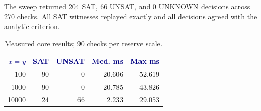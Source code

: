 The sweep returned 204 SAT, 66 UNSAT, and 0 UNKNOWN decisions across 270 checks. All SAT witnesses replayed exactly and all decisions agreed with the analytic criterion.
\begin{table}[t]\centering\caption{Measured core results; 90 checks per reserve scale.}\begin{tabular}{rrrrr}\toprule
\textcolor{Navy}{$x=y$} & \textcolor{Navy}{SAT} & \textcolor{Navy}{UNSAT} & \textcolor{Navy}{Med. ms} & \textcolor{Navy}{Max ms}\\\midrule
100 & 90 & 0 & 20.606 & 52.619\\
1000 & 90 & 0 & 20.785 & 43.826\\
10000 & 24 & 66 & 2.233 & 29.053\\
\bottomrule\end{tabular}\end{table}
